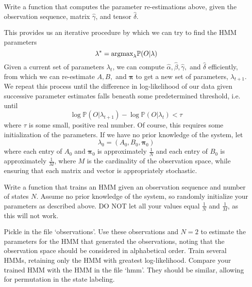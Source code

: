 \begin{problem}
Write a function that computes the parameter re-estimations above, given the observation sequence, matrix $\widehat{\gamma}$, and tensor $\widehat{\delta}$.
\end{problem}

This provides us an iterative procedure by which we can try to find the HMM parameters \begin{equation*}
\lambda^{*} = \mbox{argmax}_{\lambda} \mathbb{P}(O | \lambda)
\end{equation*}
Given a current set of parameters $\lambda_{t}$, we can compute $\widehat{\alpha}, \widehat{\beta}, \widehat{\gamma},$ and $\widehat{\delta}$ efficiently, from which we can re-estimate $A, B,$ and $\mathbf{\pi}$ to get a new set of parameters, $\lambda_{t+1}$. We repeat this process until the difference in log-likelihood of our data given successive parameter estimates falls beneath some predetermined threshold, i.e. until
\begin{equation*}
\log \mathbb{P}(O | \lambda_{t+1}) - \log \mathbb{P}(O | \lambda_{t}) < \tau
\end{equation*}
where $\tau$ is some small, positive real number.
Of course, this requires some initialization of the parameters. If we have no prior knowledge of the system, let 
\begin{equation*}
\lambda_{0} = \left( A_{0}, B_{0}, \mathbf{\pi}_{0} \right)
\end{equation*}
where each entry of $A_{0}$ and $\mathbf{\pi}_{0}$ is approximately $\frac{1}{N}$ and each entry of $B_{0}$ is approximately $\frac{1}{M}$, where $M$ is the cardinality of the observation space, while ensuring that each matrix and vector is appropriately stochastic.

\begin{problem}
Write a function that trains an HMM given an observation sequence and number of states $N$. Assume no prior knowledge of the system, so randomly initialize your parameters as described above. DO NOT let all your values equal $\frac{1}{N}$ and $\frac{1}{M}$, as this will not work.
\end{problem}

\begin{problem}
Pickle in the file `observations'. Use these observations and $N = 2$ to estimate the parameters for the HMM that generated the observations, noting that the observation space should be considered in alphabetical order. Train several HMMs, retaining only the HMM with greatest log-likelihood. Compare your trained HMM with the HMM in the file `hmm'. They should be similar, allowing for permutation in the state labeling.
\end{problem}